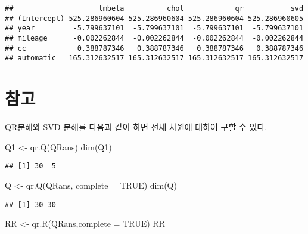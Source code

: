 \documentclass[
]{book}
\newenvironment{Shaded}{\begin{snugshade}}{\end{snugshade}}
\newcommand{\AttributeTok}[1]{\textcolor[rgb]{0.77,0.63,0.00}{#1}}
\newcommand{\ConstantTok}[1]{\textcolor[rgb]{0.00,0.00,0.00}{#1}}
\newcommand{\FunctionTok}[1]{\textcolor[rgb]{0.00,0.00,0.00}{#1}}
\newcommand{\NormalTok}[1]{#1}
\newcommand{\OtherTok}[1]{\textcolor[rgb]{0.56,0.35,0.01}{#1}}
\begin{document}
\begin{verbatim}
##                    lmbeta          chol            qr           svd
## (Intercept) 525.286960604 525.286960604 525.286960604 525.286960605
## year         -5.799637101  -5.799637101  -5.799637101  -5.799637101
## mileage      -0.002262844  -0.002262844  -0.002262844  -0.002262844
## cc            0.388787346   0.388787346   0.388787346   0.388787346
## automatic   165.312632517 165.312632517 165.312632517 165.312632517
\end{verbatim}

\hypertarget{uxcc38uxace0}{%
\section{참고}\label{uxcc38uxace0}}

QR분해와 SVD 분해를 다음과 같이 하면 전체 차원에 대하여 구할 수 있다.

\begin{Shaded}
\begin{Highlighting}[]
\NormalTok{Q1 }\OtherTok{\textless{}{-}} \FunctionTok{qr.Q}\NormalTok{(QRans)}
\FunctionTok{dim}\NormalTok{(Q1)}
\end{Highlighting}
\end{Shaded}

\begin{verbatim}
## [1] 30  5
\end{verbatim}

\begin{Shaded}
\begin{Highlighting}[]
\NormalTok{Q }\OtherTok{\textless{}{-}} \FunctionTok{qr.Q}\NormalTok{(QRans, }\AttributeTok{complete =} \ConstantTok{TRUE}\NormalTok{)}
\FunctionTok{dim}\NormalTok{(Q)}
\end{Highlighting}
\end{Shaded}

\begin{verbatim}
## [1] 30 30
\end{verbatim}

\begin{Shaded}
\begin{Highlighting}[]
\NormalTok{RR }\OtherTok{\textless{}{-}} \FunctionTok{qr.R}\NormalTok{(QRans,}\AttributeTok{complete =} \ConstantTok{TRUE}\NormalTok{) }
\NormalTok{RR}
\end{Highlighting}
\end{Shaded}
\end{document}
